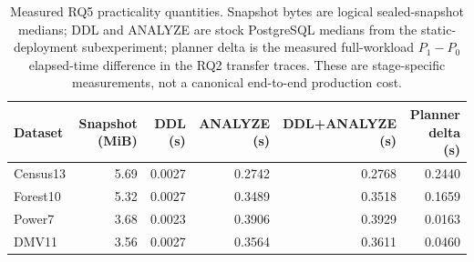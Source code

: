 \begin{table}[t]
\centering
\scriptsize
\caption{Measured RQ5 practicality quantities. Snapshot bytes are logical
sealed-snapshot medians; DDL and ANALYZE are stock PostgreSQL medians from the
static-deployment subexperiment; planner delta is the measured full-workload
$P_1-P_0$ elapsed-time difference in the RQ2 transfer traces. These are
stage-specific measurements, not a canonical end-to-end production cost.}
\label{tab:rq5-practicality}
\begin{tabular}{lrrrrr}
\toprule
Dataset & Snapshot (MiB) & DDL (s) & ANALYZE (s) & DDL+ANALYZE (s) & Planner delta (s) \\
\midrule
Census13 & 5.69 & 0.0027 & 0.2742 & 0.2768 & 0.2440 \\
Forest10 & 5.32 & 0.0027 & 0.3489 & 0.3518 & 0.1659 \\
Power7 & 3.68 & 0.0023 & 0.3906 & 0.3929 & 0.0163 \\
DMV11 & 3.56 & 0.0027 & 0.3564 & 0.3611 & 0.0460 \\
\bottomrule
\end{tabular}
\end{table}
